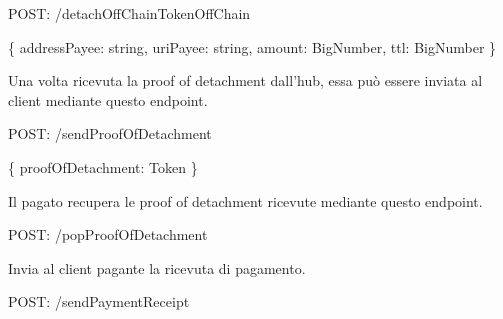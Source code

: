 \documentclass[12pt,italian,]{book}
\newenvironment{Shaded}{}{}
\newcommand{\DataTypeTok}[1]{\textcolor[rgb]{0.56,0.13,0.00}{#1}}
\newcommand{\NormalTok}[1]{#1}
\newcommand{\OperatorTok}[1]{\textcolor[rgb]{0.40,0.40,0.40}{#1}}
\newcommand{\SpecialStringTok}[1]{\textcolor[rgb]{0.73,0.40,0.53}{#1}}
\begin{document}
\begin{Shaded}
\begin{Highlighting}[]
\NormalTok{POST}\OperatorTok{:} \SpecialStringTok{/detachOffChainTokenOffChain}
\end{Highlighting}
\end{Shaded}

\begin{Shaded}
\begin{Highlighting}[]
\OperatorTok{\{}
    \DataTypeTok{addressPayee}\OperatorTok{:}\NormalTok{ string}\OperatorTok{,}
    \DataTypeTok{uriPayee}\OperatorTok{:}\NormalTok{ string}\OperatorTok{,}
    \DataTypeTok{amount}\OperatorTok{:}\NormalTok{ BigNumber}\OperatorTok{,}
    \DataTypeTok{ttl}\OperatorTok{:}\NormalTok{ BigNumber}
\OperatorTok{\}}
\end{Highlighting}
\end{Shaded}

Una volta ricevuta la proof of detachment dall'hub, essa può essere inviata al client mediante questo endpoint.

\begin{Shaded}
\begin{Highlighting}[]
\NormalTok{POST}\OperatorTok{:} \SpecialStringTok{/sendProofOfDetachment}
\end{Highlighting}
\end{Shaded}

\begin{Shaded}
\begin{Highlighting}[]
\OperatorTok{\{}
    \DataTypeTok{proofOfDetachment}\OperatorTok{:}\NormalTok{ Token}
\OperatorTok{\}}
\end{Highlighting}
\end{Shaded}

Il pagato recupera le proof of detachment ricevute mediante questo endpoint.

\begin{Shaded}
\begin{Highlighting}[]
\NormalTok{POST}\OperatorTok{:} \SpecialStringTok{/popProofOfDetachment}
\end{Highlighting}
\end{Shaded}

Invia al client pagante la ricevuta di pagamento.

\begin{Shaded}
\begin{Highlighting}[]
\NormalTok{POST}\OperatorTok{:} \SpecialStringTok{/sendPaymentReceipt}
\end{Highlighting}
\end{Shaded}
\end{document}
